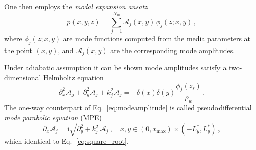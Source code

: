 \documentclass[11pt,a4paper]{article}
\newcommand{\iu}{\mathrm{i}} %
\theoremstyle{plain}%
\theoremstyle{definition}
\theoremstyle{remark}
\begin{document}
One then employs the \textit{modal expansion ansatz}
\begin{equation}\label{eq:modeansatz}
    p(x,y,z) = \sum_{j=1}^{N_m} \mathcal{A}_j(x,y) \,\phi_j(z;x,y)\,,
\end{equation}
where $\phi_j(z;x,y)$ are mode functions computed from the media parameters at the point $(x,y)$, and $\mathcal{A}_j(x,y)$ are the corresponding mode amplitudes.

Under adiabatic assumption it can be shown \cite{jensen2011computational} mode amplitudes satisfy a two-dimensional Helmholtz equation
\begin{equation}\label{eq:modeamplitude}
   \partial^2_x \mathcal{A}_j + \partial^2_y \mathcal{A}_j + k_j^2  \mathcal{A}_j = -\delta(x) \delta(y)\frac{\phi_j(z_s)}{\rho_w}\,.
\end{equation}
The one-way counterpart of Eq.~\eqref{eq:modeamplitude} is called pseudodifferential \textit{mode parabolic equation} (MPE) 
\begin{equation}\label{eq:ampl_evolution}
    \partial_x \mathcal{A}_j = \iu \sqrt{\partial_y^2 + k^2_j}\,\mathcal{A}_j\,, \quad x,y \in (0,x_{\max})\times(-L_y^*,L_y^*)\,,
\end{equation}
which identical to Eq.~\eqref{eq:square_root}.
\end{document}
